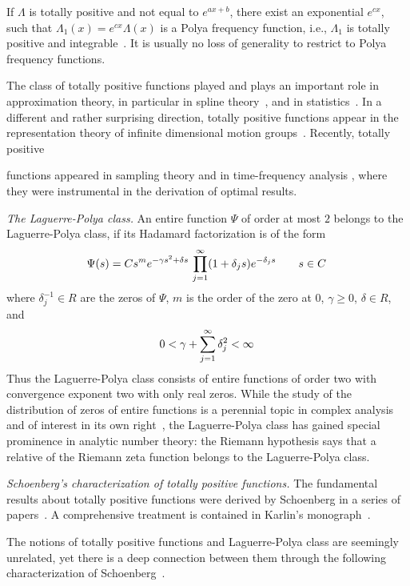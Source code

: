 \documentclass{article}
\newcommand{\tmem}[1]{{\em #1\/}}
\newcommand{\tfa}{time-frequency analysis}
\providecommand{\*}{{\opl}}
\newcommand{\field}[1]{#1}
\newcommand{\bR}{\field{R}}
\newcommand{\bC}{\field{C}}
\newcommand{\<}{}
\newcommand{\>}{}
\newcommand{\inv}{^{- 1}}
\newcommand{\tp}{totally positive}
\newcommand{\lpc}{Laguerre-Polya class}
\newcommand{\pff}{Polya frequency function}
\begin{document}
If $\Lambda$ is {\tp} and not equal to $e^{ax + b}$, there exist an
exponential $e^{cx}$, such that $\Lambda_1 (x) = e^{cx} \Lambda (x)$ is a
{\pff}, i.e., $\Lambda_1$ is {\tp} and integrable~{\cite[Lemma~4]{sch51}}. It
is usually no loss of generality to restrict to {\pff}s.

The class of {\tp} functions played and plays an important role in
approximation theory, in particular in spline theory~{\cite{SW53}}, and in
statistics~{\cite{Efr65,karlin}}. In a different and rather surprising
direction, {\tp} functions appear in the representation theory of infinite
dimensional motion groups~{\cite{Pick91}}. Recently, {\tp}

functions appeared in sampling theory and in {\tfa} {\cite{GS13,GRS18,GRS20}},
where they were instrumental in the derivation of optimal results.

{\tmem{The Laguerre-Polya class.}} An entire function $\Psi$ of order at most
$2$ belongs to the Laguerre-Polya class, if its Hadamard factorization is of
the form
\begin{equation}
  \label{eq:2} \Psi (s) = Cs^m e^{- \gamma s^2 + \delta s}  \hspace{0.17em}
  \prod_{j = 1}^{\infty} (1 + \delta_j s) e^{- \delta_j s}  \qquad s \in \bC
  \hspace{0.17em}
\end{equation}
where $\delta_j \inv \in \bR$ are the zeros of $\Psi$, $m$ is the order of the
zero at $0$, $\gamma \geq 0$, $\delta \in \bR$, and
\begin{equation}
  \label{eq:3} 0 < \gamma + \sum_{j = 1}^{\infty} \delta_j^2 < \infty
  \hspace{0.17em}
\end{equation}
Thus the {\lpc} consists of entire functions of order two with convergence
exponent two with only real zeros. While the study of the distribution of
zeros of entire functions is a perennial topic in complex analysis and of
interest in its own right~{\cite{Levin80}}, the {\lpc} has gained special
prominence in analytic number theory: the Riemann hypothesis says that a
relative of the Riemann zeta function belongs to the {\lpc}.

{\tmem{Schoenberg's characterization of {\tp} functions.}} The fundamental
results about {\tp} functions were derived by Schoenberg in a series of
papers~{\cite{sch47,Sch50,sch51,SW53}}. A comprehensive treatment is contained
in Karlin's monograph~{\cite[Ch.~7]{karlin}}.

The notions of {\tp} functions and {\lpc} are seemingly unrelated, yet there
is a deep connection between them through the following characterization of
Schoenberg~{\cite{sch51}}.
\end{document}
